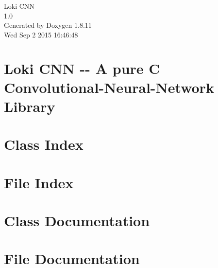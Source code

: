 \documentclass[twoside]{book}
\newcommand{\+}{\discretionary{\mbox{\scriptsize$\hookleftarrow$}}{}{}}
\newcommand{\clearemptydoublepage}{%
  \newpage{\pagestyle{empty}\cleardoublepage}%
}
\begin{document}
\hypersetup{pageanchor=false,
             bookmarks=true,
             bookmarksnumbered=true,
             pdfencoding=unicode
            }
\begin{titlepage}
\vspace*{7cm}
\begin{center}%
{\Large Loki C\+NN \\[1ex]\large 1.\+0 }\\
\vspace*{1cm}
{\large Generated by Doxygen 1.8.11}\\
\vspace*{0.5cm}
{\small Wed Sep 2 2015 16:46:48}\\
\end{center}
\end{titlepage}
\clearemptydoublepage
\tableofcontents
\clearemptydoublepage
{}
\hypersetup{pageanchor=true}

\chapter{Loki C\+NN -\/-\/ A pure C Convolutional-\/\+Neural-\/\+Network Library}
\label{index}\hypertarget{index}{}
\chapter{Class Index}

\chapter{File Index}

\chapter{Class Documentation}










\chapter{File Documentation}






























\backmatter
\newpage
{}
\clearemptydoublepage
{}
\printindex
\end{document}
